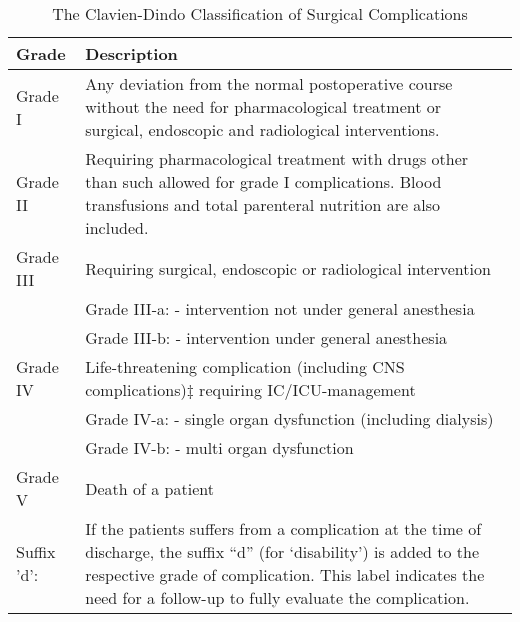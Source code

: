 \begin{sidewaystable}[htbp]
\caption{The Clavien-Dindo Classification of Surgical Complications}
\label{table:clavien-dindo}
\centering
\renewcommand{\arraystretch}{1.2} %
\begin{tabular}{|l m{15cm}|}
 \hline
 Grade  &   Description  \\ \hline
 
 Grade I     &   Any deviation from the normal postoperative course without the need for pharmacological treatment or surgical, endoscopic and radiological interventions. \\ 
 
Grade II      &   Requiring pharmacological treatment with drugs other than such allowed for grade I complications. Blood transfusions and total parenteral nutrition are also included.\\ 
Grade III     &   Requiring surgical, endoscopic or radiological intervention\\
                &  Grade III-a: - intervention not under general anesthesia\\
                &  Grade III-b: - intervention under general anesthesia\\ 
Grade IV       &  Life-threatening complication (including CNS complications)‡ requiring IC/ICU-management\\
                &   Grade IV-a: - single organ dysfunction (including dialysis)\\
                &   Grade IV-b: - multi organ dysfunction\\ 
Grade V        &   Death of a patient\\ \hline
Suffix 'd':     &   If the patients suffers from a complication at the time of discharge,  the suffix  “d”  (for ‘disability’) is added to the respective grade of complication. This label indicates the need for a follow-up to fully evaluate the complication.\\ \hline
 
 
\end{tabular}

\end{sidewaystable}



 	
